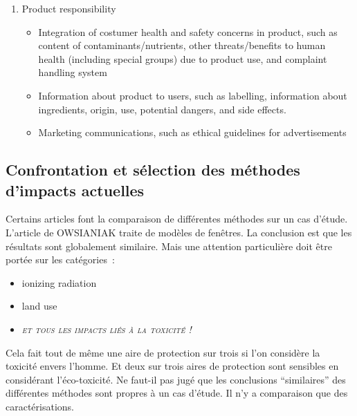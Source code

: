 {\begin{enumerate}
\begin{itemize}
	\item Development support and positive actions towards society, including job creation, support of local suppliers, general support of developing countries, investments in research and development, infrastructure, and local community education programmes 
	\item Local community acceptance, such as complaints from society, and presence of communication channels 
	\item Ensuring of commitment to sustainability issues from and towards business partners 
      \end{itemize}
  \item Product responsibility 
      \begin{itemize}
      \item Integration of costumer health and safety concerns in product, such as content of contaminants/nutrients, other threats/benefits to human health (including special groups) due to product use, and complaint handling system
      \item Information about product to users, such as labelling, information about ingredients, origin, use, potential dangers, and side effects. 
      \item Marketing communications, such as ethical guidelines for advertisements 
      \end{itemize}
  \end{enumerate}
  }

\subsection{Confrontation et sélection des méthodes d'impacts actuelles}

Certains articles font la comparaison de différentes méthodes sur un cas d'étude.
L'article de OWSIANIAK\cite{owsianiak_impact_2014} traite de modèles de fenêtres.
La conclusion est que les résultats sont globalement similaire.
Mais une attention particulière doit être portée sur les catégories~:
\begin{itemize}
\item ionizing radiation 
\item land use 
\item \emph{\textsc{et tous les impacts liés à la toxicité !}}
\end{itemize}
Cela fait tout de même une aire de protection sur trois si l'on considère la toxicité envers l'homme.
Et deux sur trois aires de protection sont sensibles en considérant l'éco-toxicité.
Ne faut-il pas jugé que les conclusions ``similaires'' des différentes méthodes sont propres à un cas d'étude.
Il n'y a comparaison que des caractérisations.

